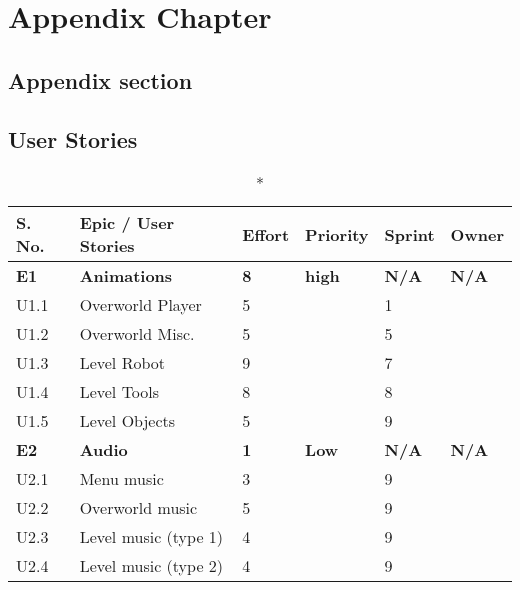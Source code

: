 \appendix
\chapter{Appendix Chapter}

\section{Appendix section}
\section{User Stories}
\begin{longtable}[h!]{|p{1cm}|p{8.6cm}|p{1cm}|p{1.2cm}|p{1.2cm}|p{1.3cm}|}
    \caption*{}
    \centering
    \hline
    S. No. & Epic / User Stories & Effort & Priority & Sprint & Owner \\ 
    \hline
    \midrule
	\textbf{E1}   & \textbf{Animations} & \textbf{8} & \textbf{high} & \textbf{N/A} & \textbf{N/A}\\
    \hline
    U1.1  & Overworld Player   & 5 & & 1 & \\
    \hline
    U1.2  & Overworld Misc.    & 5 & & 5 & \\
    \hline
    U1.3  & Level Robot        & 9 & & 7 & \\
    \hline
    U1.4  & Level Tools        & 8 & & 8 & \\
    \hline
    U1.5  & Level Objects      & 5 & & 9 & \\
    \hline
	\midrule
    \textbf{E2}   & \textbf{Audio}   &  \textbf{1}  & \textbf{Low} & \textbf{N/A} & \textbf{N/A}   \\ 
    \hline
    U2.1 & Menu music           & 3 & & 9 & \\
    \hline
    U2.2 & Overworld music      & 5 & & 9 & \\
    \hline
    U2.3 & Level music (type 1) & 4 & & 9 & \\
    \hline
    U2.4 & Level music (type 2) & 4 & & 9 & \\

\end{longtable}

